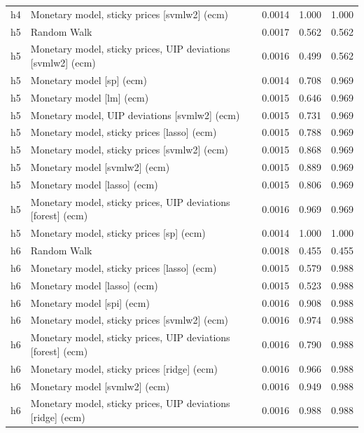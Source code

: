 \begin{ThreePartTable}
\begin{longtable}[t]{cp{5.5cm}ccc}
h4 & \raggedright Monetary model, sticky prices [svmlw2] (ecm) & 0.0014 & 1.000 & 1.000\\
\addlinespace
h5 & \raggedright Random Walk & 0.0017 & 0.562 & 0.562\\
h5 & \raggedright Monetary model, sticky prices, UIP deviations [svmlw2] (ecm) & 0.0016 & 0.499 & 0.562\\
h5 & \raggedright Monetary model [sp] (ecm) & 0.0014 & 0.708 & 0.969\\
h5 & \raggedright Monetary model [lm] (ecm) & 0.0015 & 0.646 & 0.969\\
h5 & \raggedright Monetary model, UIP deviations [svmlw2] (ecm) & 0.0015 & 0.731 & 0.969\\
h5 & \raggedright Monetary model, sticky prices [lasso] (ecm) & 0.0015 & 0.788 & 0.969\\
h5 & \raggedright Monetary model, sticky prices [svmlw2] (ecm) & 0.0015 & 0.868 & 0.969\\
h5 & \raggedright Monetary model [svmlw2] (ecm) & 0.0015 & 0.889 & 0.969\\
h5 & \raggedright Monetary model [lasso] (ecm) & 0.0015 & 0.806 & 0.969\\
h5 & \raggedright Monetary model, sticky prices, UIP deviations [forest] (ecm) & 0.0016 & 0.969 & 0.969\\
h5 & \raggedright Monetary model, sticky prices [sp] (ecm) & 0.0014 & 1.000 & 1.000\\
\addlinespace
h6 & \raggedright Random Walk & 0.0018 & 0.455 & 0.455\\
h6 & \raggedright Monetary model, sticky prices [lasso] (ecm) & 0.0015 & 0.579 & 0.988\\
h6 & \raggedright Monetary model [lasso] (ecm) & 0.0015 & 0.523 & 0.988\\
h6 & \raggedright Monetary model [spi] (ecm) & 0.0016 & 0.908 & 0.988\\
h6 & \raggedright Monetary model, sticky prices [svmlw2] (ecm) & 0.0016 & 0.974 & 0.988\\
h6 & \raggedright Monetary model, sticky prices, UIP deviations [forest] (ecm) & 0.0016 & 0.790 & 0.988\\
h6 & \raggedright Monetary model, sticky prices [ridge] (ecm) & 0.0016 & 0.966 & 0.988\\
h6 & \raggedright Monetary model [svmlw2] (ecm) & 0.0016 & 0.949 & 0.988\\
h6 & \raggedright Monetary model, sticky prices, UIP deviations [ridge] (ecm) & 0.0016 & 0.988 & 0.988\\

\end{longtable}
\end{ThreePartTable}
